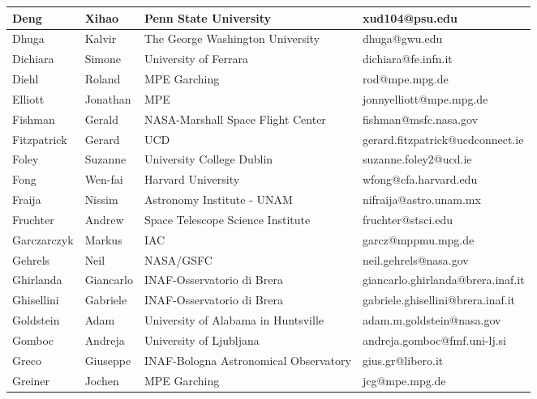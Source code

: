 \begin{center}
\begin{longtable}{|p{1.6cm} |p{1.6cm} |p{2cm} |p{3cm} |}
\tiny Deng &\tiny Xihao & \tiny Penn State University & \tiny xud104@psu.edu \\ \hline
\tiny Dhuga &\tiny Kalvir & \tiny The George Washington University & \tiny dhuga@gwu.edu \\ \hline
\tiny Dichiara &\tiny Simone & \tiny University of Ferrara & \tiny dichiara@fe.infn.it \\ \hline
\tiny Diehl &\tiny Roland & \tiny MPE Garching & \tiny rod@mpe.mpg.de \\ \hline
\tiny Elliott &\tiny Jonathan & \tiny MPE & \tiny jonnyelliott@mpe.mpg.de \\ \hline
\tiny Fishman &\tiny Gerald & \tiny NASA-Marshall Space Flight Center & \tiny fishman@msfc.nasa.gov \\ \hline
\tiny Fitzpatrick &\tiny Gerard & \tiny UCD & \tiny gerard.fitzpatrick@ucdconnect.ie \\ \hline
\tiny Foley &\tiny Suzanne & \tiny University College Dublin & \tiny suzanne.foley2@ucd.ie \\ \hline
\tiny Fong &\tiny Wen-fai & \tiny Harvard University & \tiny wfong@cfa.harvard.edu \\ \hline
\tiny Fraija &\tiny Nissim & \tiny Astronomy Institute - UNAM & \tiny nifraija@astro.unam.mx \\ \hline
\tiny Fruchter &\tiny Andrew & \tiny Space Telescope Science Institute & \tiny fruchter@stsci.edu \\ \hline
\tiny Garczarczyk &\tiny Markus & \tiny IAC & \tiny garcz@mppmu.mpg.de \\ \hline
\tiny Gehrels &\tiny Neil & \tiny NASA/GSFC & \tiny neil.gehrels@nasa.gov \\ \hline
\tiny Ghirlanda &\tiny Giancarlo & \tiny INAF-Osservatorio di Brera & \tiny giancarlo.ghirlanda@brera.inaf.it \\ \hline
\tiny Ghisellini &\tiny Gabriele & \tiny INAF-Osservatorio di Brera & \tiny gabriele.ghisellini@brera.inaf.it \\ \hline
\tiny Goldstein &\tiny Adam & \tiny University of Alabama in Huntsville & \tiny adam.m.goldstein@nasa.gov \\ \hline
\tiny Gomboc &\tiny Andreja & \tiny University of Ljubljana & \tiny andreja.gomboc@fmf.uni-lj.si \\ \hline
\tiny Greco &\tiny Giuseppe & \tiny INAF-Bologna Astronomical Observatory & \tiny gius.gr@libero.it \\ \hline
\tiny Greiner &\tiny Jochen & \tiny MPE Garching & \tiny jcg@mpe.mpg.de \\ \hline

\end{longtable}
\end{center}
